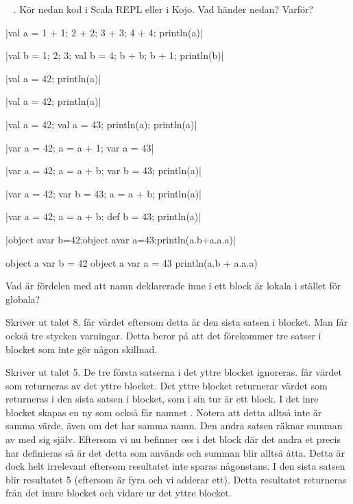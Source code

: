 \SubtaskSolved  {}



\QUESTEND









\QUESTBEGIN

\Task  \what~ . Kör nedan kod i Scala REPL eller i Kojo. Vad händer nedan? Varför?

\Subtask \code|val a = {1 + 1; 2 + 2; 3 + 3; 4 + 4}; println(a)|

\Subtask \code|val b = {1; 2; 3; {val b = 4; b + b; b + 1}}; println(b)|

\Subtask \code|{val a = 42; println(a)}|

\Subtask \code|{val a = 42}; println(a)|

\Subtask \code|{val a = 42; {val a = 43; println(a)}; println(a)}|

\Subtask \code|{var a = 42; {a = a + 1}; var a = 43}|

\Subtask \code|{var a = 42; {a = a + b; var b = 43}; println(a)}|

\Subtask \code|{var a = 42; {var b = 43; a = a + b}; println(a)}|

\Subtask \code|{var a = 42; {a = a + b; def b = 43}; println(a)}|

\Subtask \code|{object a{var b=42;object a{var a=43}};println(a.b+a.a.a)}|

\Subtask

\begin{Code}
{
  object a {
    var b = 42
    object a {
      var a = 43
    }
  }
  println(a.b + a.a.a)
}
\end{Code}

\Subtask Vad är fördelen med att namn deklarerade inne i ett block är lokala i stället för globala?


\SOLUTION


\TaskSolved \what


\SubtaskSolved  Skriver ut talet 8.  får värdet  eftersom detta är den sista satsen i blocket. Man får också tre stycken varningar. Detta beror på att det förekommer tre satser i blocket som inte gör någon skillnad.

\SubtaskSolved  Skriver ut talet 5. De tre första satserna i det yttre blocket ignoreras.  får värdet som returneras av det yttre blocket. Det yttre blocket returnerar värdet som returneras i den sista satsen i blocket, som i sin tur är ett block. I det inre blocket skapas en ny  som också får namnet . Notera att detta alltså inte är samma värde, även om det har samma namn. Den andra satsen räknar summan av  med sig själv. Eftersom vi nu befinner oss i det block där det andra et precis har definieras så är det detta  som används och summan blir alltså åtta. Detta är dock helt irrelevant eftersom resultatet inte sparas någonstans. I den sista satsen blir resultatet 5 (eftersom  är fyra och vi adderar ett). Detta resultatet returneras från det innre blocket och vidare ur det yttre blocket.

